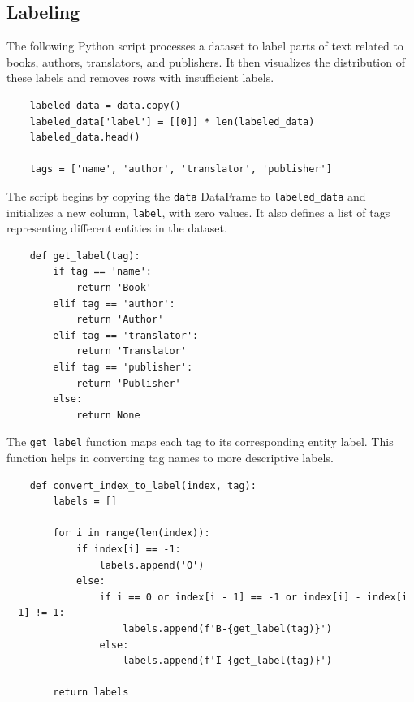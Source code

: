 \documentclass{solutionclass} %
\begin{document}
\subsection*{Labeling}




\begin{solution}

    The following Python script processes a dataset to label parts of text related to books, authors, translators, and publishers. It then visualizes the distribution of these labels and removes rows with insufficient labels.

    \begin{lstlisting}
    labeled_data = data.copy()
    labeled_data['label'] = [[0]] * len(labeled_data)
    labeled_data.head()
    
    tags = ['name', 'author', 'translator', 'publisher']
    \end{lstlisting}
    
    The script begins by copying the \texttt{data} DataFrame to \texttt{labeled\_data} and initializes a new column, \texttt{label}, with zero values. It also defines a list of tags representing different entities in the dataset.
    
    \begin{lstlisting}
    def get_label(tag):
        if tag == 'name':
            return 'Book'
        elif tag == 'author':
            return 'Author'
        elif tag == 'translator':
            return 'Translator'
        elif tag == 'publisher':
            return 'Publisher'
        else:
            return None
    \end{lstlisting}
    
    The \texttt{get\_label} function maps each tag to its corresponding entity label. This function helps in converting tag names to more descriptive labels.
    
    \begin{lstlisting}
    def convert_index_to_label(index, tag):
        labels = []
    
        for i in range(len(index)):
            if index[i] == -1:
                labels.append('O')
            else:
                if i == 0 or index[i - 1] == -1 or index[i] - index[i - 1] != 1:
                    labels.append(f'B-{get_label(tag)}')
                else:
                    labels.append(f'I-{get_label(tag)}')
    
        return labels
    \end{lstlisting}
    

\end{solution}
\end{document}
